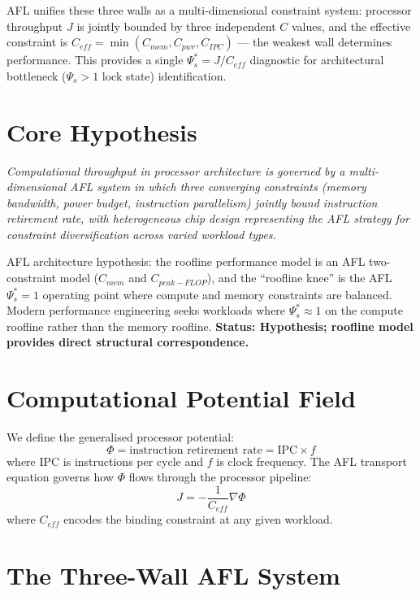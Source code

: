 \documentclass[11pt]{article}
\begin{document}
AFL unifies these three walls as a multi-dimensional constraint system: processor throughput
$J$ is jointly bounded by three independent $C$ values, and the effective constraint is
$C_{eff} = \min(C_{mem}, C_{pwr}, C_{IPC})$ --- the weakest wall determines performance.
This provides a single $\Psi_s^* = J/C_{eff}$ diagnostic for architectural bottleneck ($\Psi_s > 1$ lock state) identification.

\section{Core Hypothesis}

\begin{center}
\textit{
Computational throughput in processor architecture is governed by a multi-dimensional AFL system
in which three converging constraints (memory bandwidth, power budget, instruction parallelism)
jointly bound instruction retirement rate, with heterogeneous chip design representing the
AFL strategy for constraint diversification across varied workload types.
}
\end{center}

AFL architecture hypothesis: the roofline performance model is an AFL two-constraint model
($C_{mem}$ and $C_{peak-FLOP}$), and the ``roofline knee'' is the AFL $\Psi_s^* = 1$ operating
point where compute and memory constraints are balanced. Modern performance engineering
seeks workloads where $\Psi_s^* \approx 1$ on the compute roofline rather than the memory roofline.
\textbf{Status: Hypothesis; roofline model provides direct structural correspondence.}

\section{Computational Potential Field}

We define the generalised processor potential:
\begin{equation}
\Phi = \text{instruction retirement rate} = \text{IPC} \times f
\end{equation}
where IPC is instructions per cycle and $f$ is clock frequency. The AFL transport equation
governs how $\Phi$ flows through the processor pipeline:
\begin{equation}
J = -\frac{1}{C_{eff}}\nabla \Phi
\end{equation}
where $C_{eff}$ encodes the binding constraint at any given workload.

\section{The Three-Wall AFL System}
\end{document}
